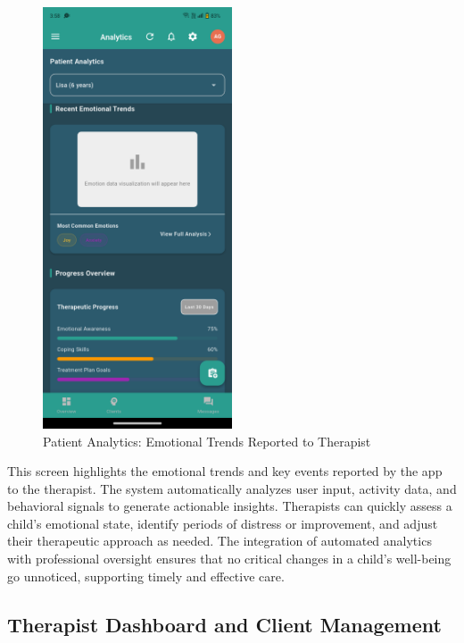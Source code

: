 \documentclass[12pt,a4paper]{article}
\newcommand{\sectiontitle}[1]{\subsection{#1}}
\begin{document}
\begin{figure}[H]
    \centering
    \includegraphics[width=0.5\textwidth]{Screenshots/patientanalyticsthatreportsemotionaltrendsofchildtotherapist.png}
    \caption{Patient Analytics: Emotional Trends Reported to Therapist}
    \label{fig:patient-analytics-therapist}
\end{figure}
This screen highlights the emotional trends and key events reported by the app to the therapist. The system automatically analyzes user input, activity data, and behavioral signals to generate actionable insights. Therapists can quickly assess a child's emotional state, identify periods of distress or improvement, and adjust their therapeutic approach as needed. The integration of automated analytics with professional oversight ensures that no critical changes in a child's well-being go unnoticed, supporting timely and effective care.

\sectiontitle{Therapist Dashboard and Client Management}
\end{document}
